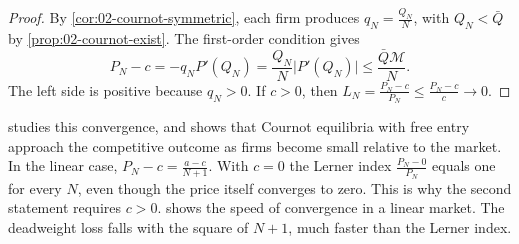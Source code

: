 \begin{proof}
By \cref{cor:02-cournot-symmetric}, each firm produces $q_N = \frac{Q_N}{N}$, with $Q_N < \bar Q$ by
\cref{prop:02-cournot-exist}. The first-order condition gives
\[
  P_N - c = -q_NP'(Q_N) = \frac{Q_N}{N}\lvert P'(Q_N)\rvert \le \frac{\bar Q\mathcal{M}}{N} .
\]
The left side is positive because $q_N > 0$. If $c > 0$, then $L_N = \frac{P_N - c}{P_N} \le \frac{P_N - c}{c}
\to 0$.
\end{proof}

\citet{Ruffin1971} studies this convergence, and \citet{Novshek1980} shows that Cournot equilibria with free entry
approach the competitive outcome as firms become small relative to the market. In the linear case, $P_N - c =
\frac{a - c}{N + 1}$. With $c = 0$ the Lerner index $\frac{P_N - 0}{P_N}$ equals one for every $N$, even though the
price itself converges to zero. This is why the second statement requires $c > 0$.
 shows the speed of convergence in a linear market. The deadweight loss falls with the square
of $N + 1$, much faster than the Lerner index.


